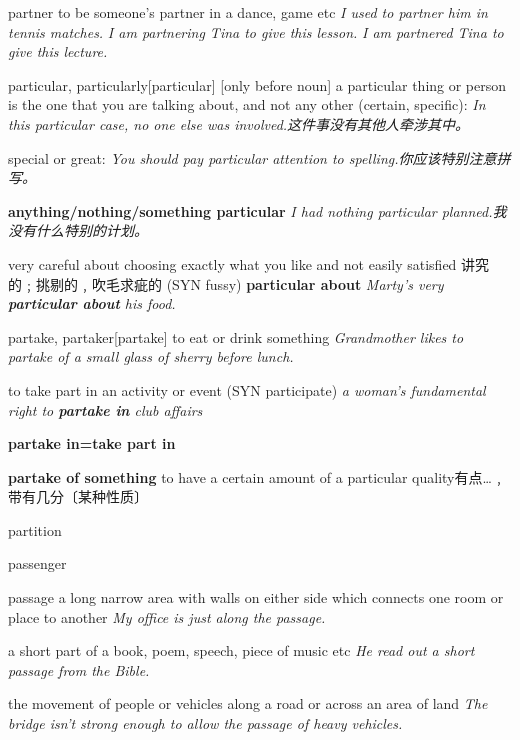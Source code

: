 \begin{DefWord}{partner}
    to be someone’s partner in a dance, game etc
    \textit{I used to partner him in tennis matches.}
    \textit{I am partnering Tina to give this lesson.}
    \textit{I am partnered Tina to give this lecture.}
\end{DefWord}

\begin{DefWord}{particular, particularly}[particular]
    [only before noun] a particular thing or person is the one that you are talking about, and not any other (certain, specific):
    \textit{In this particular case, no one else was involved.这件事没有其他人牵涉其中。}

    special or great:
    \textit{You should pay particular attention to spelling.你应该特别注意拼写。}
    
    \textbf{anything/nothing/something particular}
    \textit{I had nothing particular planned.我没有什么特别的计划。}

    very careful about choosing exactly what you like and not easily satisfied 讲究的﹔挑剔的﹐吹毛求疵的 (SYN  fussy)
    \textbf{particular about}
    \textit{Marty’s very \textbf{particular about} his food.}

\end{DefWord}

\begin{DefWord}{partake, partaker}[partake]
    to eat or drink something
    \textit{Grandmother likes to partake of a small glass of sherry before lunch.}

    to take part in an activity or event
    (SYN  participate)
    \textit{a woman’s fundamental right to \textbf{partake in} club affairs}

    \textbf{partake in=take part in}

    \textbf{partake of something} 
    to have a certain amount of a particular quality有点…﹐带有几分〔某种性质〕
\end{DefWord}

\begin{DefWord}{partition}
\end{DefWord}

\begin{DefWord}{passenger}
\end{DefWord}

\begin{DefWord}{passage}
    a long narrow area with walls on either side which connects one room or place to another
    \textit{My office is just along the passage.}

    a short part of a book, poem, speech, piece of music etc
    \textit{He read out a short passage from the Bible.}

    the movement of people or vehicles along a road or across an area of land
    \textit{The bridge isn't strong enough to allow the passage of heavy vehicles.}
\end{DefWord}


